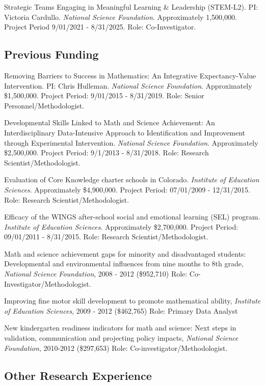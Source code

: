 \documentclass[11pt,]{article}
\begin{document}
Strategic Teams Engaging in Meaningful Learning \& Leadership (STEM-L2).
PI: Victoria Cardullo. \emph{National Science Foundation}. Approximately
1,500,000. Project Period 9/01/2021 - 8/31/2025. Role: Co-Investigator.

\hypertarget{previous-funding}{%
\subsection{Previous Funding}\label{previous-funding}}

Removing Barriers to Success in Mathematics: An Integrative
Expectancy-Value Intervention. PI: Chris Hulleman. \emph{National
Science Foundation}. Approximately \$1,500,000. Project Period:
9/01/2015 - 8/31/2019. Role: Senior Personnel/Methodologist.

Developmental Skills Linked to Math and Science Achievement: An
Interdisciplinary Data-Intensive Approach to Identification and
Improvement through Experimental Intervention. \emph{National Science
Foundation}. Approximately \$2,500,000. Project Period: 9/1/2013 -
8/31/2018. Role: Research Scientist/Methodologist.

Evaluation of Core Knowledge charter schools in Colorado.
\emph{Institute of Education Sciences}. Approximately \$4,900,000.
Project Period: 07/01/2009 - 12/31/2015. Role: Research
Scientist/Methodologist.

Efficacy of the WINGS after-school social and emotional learning (SEL)
program. \emph{Institute of Education Sciences}. Approximately
\$2,700,000. Project Period: 09/01/2011 - 8/31/2015. Role: Research
Scientist/Methodologist.

Math and science achievement gaps for minority and disadvantaged
students: Developmental and environmental influences from nine months to
8th grade, \emph{National Science Foundation}, 2008 - 2012 (\$952,710)
Role: Co-Investigator/Methodologist.

Improving fine motor skill development to promote mathematical ability,
\emph{Institute of Education Sciences}, 2009 - 2012 (\$462,765) Role:
Primary Data Analyst

New kindergarten readiness indicators for math and science: Next steps
in validation, communication and projecting policy impacts,
\emph{National Science Foundation}, 2010-2012 (\$297,653) Role:
Co-investigator/Methodologist.

\hypertarget{other-research-experience}{%
\subsection{Other Research Experience}\label{other-research-experience}}
\end{document}
